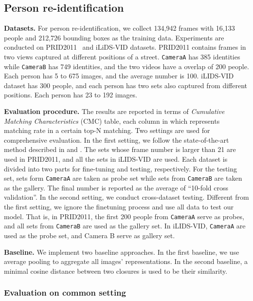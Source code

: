 \subsection{Person re-identification}
\textbf{Datasets.} For person re-identification, we collect 134,942 frames with 16,133 people and 212,726 bounding boxes as the training data. Experiments are conducted on PRID2011~\cite{hirzer11a} and iLiDS-VID\cite{wang2014person} datasets. PRID2011 contains frames in two views captured at different positions of a street. \texttt{CameraA} has 385 identities while \texttt{CameraB} has 749 identities, and the two videos have a overlap of 200 people. Each person has 5 to 675 images, and the average number is 100. iLIDS-VID dataset has 300 people, and each person has two sets also captured from different positions. Each person has 23 to 192 images.

\textbf{Evaluation procedure.}
The results are reported in terms of \emph{Cumulative Matching Characteristics} (CMC) table, each column in which represents matching rate in a certain top-N matching.
Two settings are used for comprehensive evaluation. In the first setting, we follow the state-of-the-art method described in \cite{you2016top} and \cite{wang2016person}. The sets whose frame number is larger than 21 are used in PRID2011, and all the sets in iLIDS-VID are used. Each dataset is divided into two parts for fine-tuning and testing, respectively. For the testing set, sets form \texttt{CameraA} are taken as probe set while sets from \texttt{CameraB} are taken as the gallery. The final number is reported as the average of ``10-fold cross validation''. In the second setting, we conduct cross-dataset  testing. Different from the first setting, we ignore the finetuning process and use all data to test our model. That is, in PRID2011, the first 200 people from \texttt{CameraA} serve as probes, and all sets from \texttt{CameraB} are used as the gallery set. In iLIDS-VID,  \texttt{CameraA} are used as the probe set, and Camera B serve as gallery set.

\textbf{Baseline.}
We implement two baseline approaches. In the first baseline, we use average pooling to aggregate all images' representations. In the second baseline, a minimal cosine distance between two closures is used to be their similarity.

\subsubsection{Evaluation on common setting}

